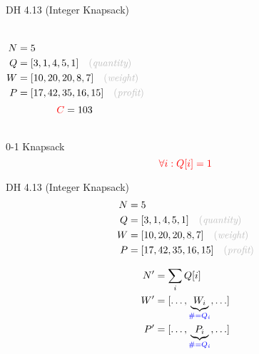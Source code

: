 
\begin{frame}{}
  \begin{exampleblock}{DH 4.13 (Integer Knapsack)}
    \begin{columns}
        \begin{align*}
          N &= 5 \\
          Q &= [3, 1, 4, 5, 1] \quad \gray{(\text{\it quantity})} \\
          W &= [10, 20, 20, 8, 7] \quad \gray{(\text{\it weight})} \\
          P &= [17, 42, 35, 16, 15] \quad \gray{(\text{\it profit})}
        \end{align*}
        \[
          \textcolor{red}{C} = 103
        \]
    \end{columns}

  \end{exampleblock}
\end{frame}

\begin{frame}{}
  \begin{exampleblock}{0-1 Knapsack}
    \[
      \textcolor{red}{\forall i: Q[i] = 1}
    \]

  \end{exampleblock}
\end{frame}

\begin{frame}{}
  \begin{exampleblock}{DH 4.13 (Integer Knapsack)}
    \begin{align*}
        N &= 5 \\
        Q &= [3, 1, 4, 5, 1] \quad \gray{(\text{\it quantity})} \\
        W &= [10, 20, 20, 8, 7] \quad \gray{(\text{\it weight})} \\
        P &= [17, 42, 35, 16, 15] \quad \gray{(\text{\it profit})}
    \end{align*}
  \end{exampleblock}

  \pause
  \begin{align*}
      N' &= \sum_{i} Q[i] \\
      W' &= [\ldots, \underbrace{W_{i}}_{\textcolor{blue}{\# = Q_{i}}}, \ldots] \\
      P' &= [\ldots, \underbrace{P_{i}}_{\textcolor{blue}{\# = Q_{i}}}, \ldots]
  \end{align*}
\end{frame}

